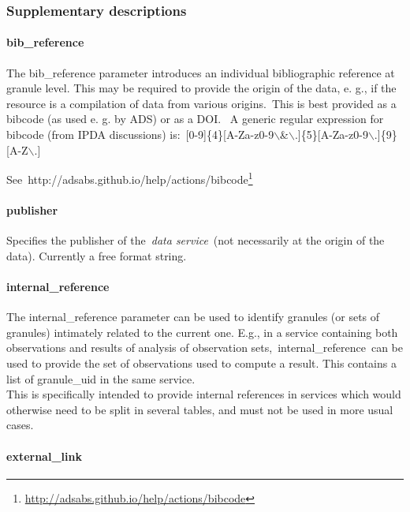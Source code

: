 \documentclass[11pt,a4paper]{ivoa}
\begin{document}
\subsubsection{Supplementary descriptions\\}

\paragraph{bib\_reference}

The bib\_reference parameter introduces an individual bibliographic reference at granule level. This may be required to provide the origin of the data, e. g., if the resource is a compilation of data from various origins. This is best provided as a bibcode (as used e. g. by ADS) or as a DOI.  A generic regular expression for bibcode (from IPDA discussions) is: [0-9]\{4\}[A-Za-z0-9$\backslash$\&$\backslash$.]\{5\}[A-Za-z0-9$\backslash$.]\{9\}[A-Z$\backslash$.] 

See http://adsabs.github.io/help/actions/bibcode\footnote{\url{http://adsabs.github.io/help/actions/bibcode}}

\paragraph{publisher}

Specifies the publisher of the \emph{data service} (not necessarily at the origin of the data). Currently a free format string.\\

\paragraph{internal\_reference}

The internal\_reference parameter can be used to identify granules (or sets of granules) intimately related to the current one. E.g., in a service containing both observations and results of analysis of observation sets, internal\_reference can be used to provide the set of observations used to compute a result. This contains a list of granule\_uid in the same service.\\This is specifically intended to provide internal references in services which would otherwise need to be split in several tables, and must not be used in more usual cases. 

\paragraph{external\_link}
\end{document}

